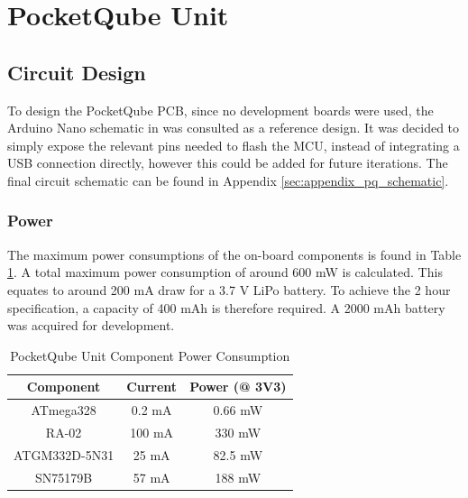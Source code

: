 \graphicspath{{./figures}}

\section{PocketQube Unit}
\subsection{Circuit Design}
To design the PocketQube PCB, since no development boards were used, the Arduino Nano schematic in \cite{design-arduinoNano} was consulted as a reference design. It was decided to simply expose the relevant pins needed to flash the MCU, instead of integrating a USB connection directly, however this could be added for future iterations. The final circuit schematic can be found in Appendix \ref{sec:appendix_pq_schematic}.

\subsubsection{Power}
The maximum power consumptions of the on-board components is found in Table \ref{tab:pqunit_component_consumption}. A total maximum power consumption of around 600 mW is calculated. This equates to around 200 mA draw for a 3.7 V LiPo battery. To achieve the 2 hour specification, a capacity of 400 mAh is therefore required. A 2000 mAh battery was acquired for development.
\begin{table}[!htb]
  \centering
  \renewcommand{\arraystretch}{1.2}
  \begin{tabular}{ |c|c|c| }
  \hline
  \textbf{Component}        & \textbf{Current}        & \textbf{Power (@ 3V3)}      \\ \hline 
  ATmega328                 & 0.2 mA                  & 0.66 mW                     \\ \hline 
  RA-02                     & 100 mA                  & 330 mW                      \\ \hline 
  ATGM332D-5N31             & 25 mA                   & 82.5 mW                     \\ \hline
  SN75179B                  & 57 mA                   & 188 mW                      \\ \hline
  \end{tabular}
  \caption{PocketQube Unit Component Power Consumption}
  \label{tab:pqunit_component_consumption}
\end{table}

